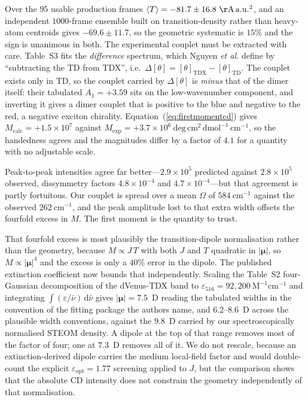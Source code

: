 \documentclass[journal=jpcbfk, manuscript=article, layout=twocolumn, doi=true]{achemso}
\begin{document}
Over the $95$ usable production frames $\langle T\rangle = -81.7 \pm
16.8~\mathrm{\AA}\,\mathrm{a.u.}^{2}$, and an independent $1000$-frame ensemble
built on transition-density rather than heavy-atom centroids gives $-69.6 \pm
11.7$, so the geometric systematic is $15\%$ and the sign is unanimous in both.
The experimental couplet must be extracted with care. Table~S3 fits the
\emph{difference} spectrum, which Nguyen \emph{et al.} define by ``subtracting
the TD from TDX'', i.e.\ $\Delta[\theta] = [\theta]_{\mathrm{TDX}} -
[\theta]_{\mathrm{TD}}$. The couplet exists only in TD, so the couplet carried
by $\Delta[\theta]$ is \emph{minus} that of the dimer itself: their tabulated
$A_{1} = +3.59$ sits on the low-wavenumber component, and inverting it gives a
dimer couplet that is positive to the blue and negative to the red, a negative
exciton chirality. Equation~(\ref{eq:firstmomentcd}) gives
$M_{\mathrm{calc}} = +1.5\times10^{7}$ against
$M_{\mathrm{exp}} = +3.7\times10^{6}~\mathrm{deg\,cm^{2}\,dmol^{-1}\,cm^{-1}}$,
so the handedness agrees and the magnitudes differ by a factor of $4.1$ for a
quantity with no adjustable scale.

Peak-to-peak intensities agree far better---$2.9\times10^{5}$ predicted against
$2.8\times10^{5}$ observed, dissymmetry factors $4.8\times10^{-4}$ and
$4.7\times10^{-4}$---but that agreement is partly fortuitous. Our couplet is
spread over a mean $\Omega$ of $584~\mathrm{cm^{-1}}$ against the observed
$262~\mathrm{cm^{-1}}$, and the peak amplitude lost to that extra width offsets
the fourfold excess in $M$. The first moment is the quantity to trust.

That fourfold excess is most plausibly the transition-dipole normalisation
rather than the geometry, because $M \propto J\,T$ with both $J$ and $T$
quadratic in $|\bm\mu|$, so $M \propto |\bm\mu|^{4}$ and the excess is only a
$40\%$ error in the dipole. The published extinction coefficient now bounds
that independently. Scaling the Table~S2 four-Gaussian decomposition of the
dVenus-TDX band to $\varepsilon_{516} = 92{,}200~\mathrm{M^{-1}cm^{-1}}$ and
integrating $\int(\varepsilon/\bar\nu)\,\mathrm{d}\bar\nu$ gives
$|\bm\mu| = 7.5$~D reading the tabulated widths in the convention of the
fitting package the authors name, and $6.2$--$8.6$~D across the plausible width
conventions, against the $9.8$~D carried by our spectroscopically normalised
STEOM density. A dipole at the top of that range removes most of the factor of
four; one at $7.3$~D removes all of it. We do not rescale, because an
extinction-derived dipole carries the medium local-field factor and would
double-count the explicit $\varepsilon_{\mathrm{opt}} = 1.77$ screening applied
to $J$, but the comparison shows that the absolute CD intensity does not
constrain the geometry independently of that normalisation.
\end{document}
